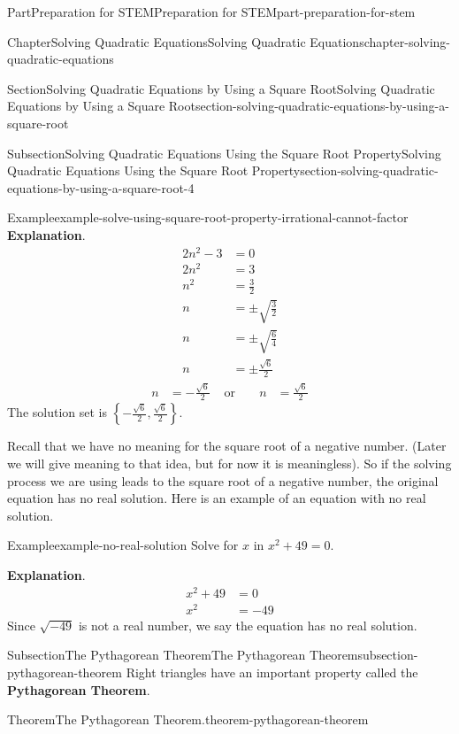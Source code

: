\documentclass[twoside,10pt,]{book}
\newcommand{\blocktitlefont}{\relax}
\newcommand{\terminology}[1]{\textbf{#1}}
\numberwithin{equation}{section}
\newcommand{\amp}{&}
\begin{document}
\begin{partptx}{Part}{Preparation for STEM}{}{Preparation for STEM}{}{}{part-preparation-for-stem}
\begin{chapterptx}{Chapter}{Solving Quadratic Equations}{}{Solving Quadratic Equations}{}{}{chapter-solving-quadratic-equations}
\begin{sectionptx}{Section}{Solving Quadratic Equations by Using a Square Root}{}{Solving Quadratic Equations by Using a Square Root}{}{}{section-solving-quadratic-equations-by-using-a-square-root}
\begin{subsectionptx}{Subsection}{Solving Quadratic Equations Using the Square Root Property}{}{Solving Quadratic Equations Using the Square Root Property}{}{}{section-solving-quadratic-equations-by-using-a-square-root-4}
\begin{example}{Example}{}{example-solve-using-square-root-property-irrational-cannot-factor}
{\makeatletter{}\makeatother\noindent\textbf{\blocktitlefont Explanation}.\hypertarget{example-solve-using-square-root-property-irrational-cannot-factor-2}{}\quad{}%
\begin{align*}
2n^2-3\amp=0\\
2n^2\amp=3\\
n^2\amp=\frac{3}{2}\\
n\amp=\pm\sqrt{\frac{3}{2}}\\
n\amp=\pm\sqrt{\frac{6}{4}}\\
n\amp=\pm\frac{\sqrt{6}}{2}
\end{align*}
%
\begin{align*}
n\amp=-\frac{\sqrt{6}}{2}\amp\text{ or }\amp\amp n\amp=\frac{\sqrt{6}}{2}
\end{align*}
The solution set is \(\left\{-\frac{\sqrt{6}}{2},\frac{\sqrt{6}}{2}\right\}\).%
}\end{example}
Recall that we have no meaning for the square root of a negative number. (Later we will give meaning to that idea, but for now it is meaningless). So if the solving process we are using leads to the square root of a negative number, the original equation has no real solution. Here is an example of an equation with no real solution.%
\begin{example}{Example}{}{example-no-real-solution}%
Solve for \(x\) in \(x^2+49=0\).%
\par\smallskip%
{\makeatletter{}\makeatother\noindent\textbf{\blocktitlefont Explanation}.\hypertarget{example-no-real-solution-2}{}\quad{}%
\begin{align*}
x^2+49\amp=0\\
x^2\amp=-49
\end{align*}
Since \(\sqrt{-49}\) is not a real number, we say the equation has no real solution.%
}\end{example}
\end{subsectionptx}
%
%
\typeout{************************************************}
\typeout{************************************************}
%
\begin{subsectionptx}{Subsection}{The Pythagorean Theorem}{}{The Pythagorean Theorem}{}{}{subsection-pythagorean-theorem}
Right triangles have an important property called the \terminology{Pythagorean Theorem}.%
\begin{theorem}{Theorem}{The Pythagorean Theorem.}{}{theorem-pythagorean-theorem}%
%

\end{theorem}
\end{subsectionptx}
\end{sectionptx}
\end{chapterptx}
\end{partptx}
\end{document}
